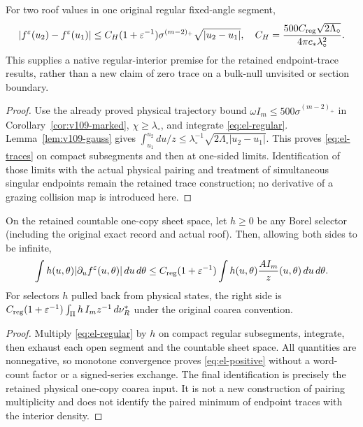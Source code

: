 \begin{corollary}
\label{cor:el-traces}
For two roof values in one original regular fixed-angle segment,
\begin{equation}\label{eq:el-traces}
 |f^\varepsilon(u_2)-f^\varepsilon(u_1)|
 \leq C_H(1+\varepsilon^{-1})\sigma^{(m-2)_+}\sqrt{|u_2-u_1|},
 \quad
 C_H=\frac{500C_{\rm reg}\sqrt{2\Lambda_\circ}}
                  {4\pi c_*\lambda_\circ^2}.
\end{equation}
This supplies a native regular-interior premise for the retained
endpoint-trace results, rather than a new claim of zero trace on a
bulk-null unvisited or section boundary.
\end{corollary}
\begin{proof}
Use the already proved physical trajectory bound
$\omega I_m\leq500\sigma^{(m-2)_+}$ in
Corollary~\ref{cor:v109-marked}, $\chi\geq\lambda_\circ$, and integrate
\eqref{eq:el-regular}. Lemma~\ref{lem:v109-gauss} gives
$\int_{u_1}^{u_2}du/z\leq\lambda_\circ^{-1}
\sqrt{2\Lambda_\circ|u_2-u_1|}$. This proves \eqref{eq:el-traces} on
compact subsegments and then at one-sided limits. Identification of
those limits with the actual physical pairing and treatment of
simultaneous singular endpoints remain the retained trace construction;
no derivative of a grazing collision map is introduced here.
\end{proof}

\begin{proposition}
\label{prop:el-positive}
On the retained countable one-copy sheet space, let $h\geq0$ be any
Borel selector (including the original exact record and actual roof).
Then, allowing both sides to be infinite,
\begin{equation}\label{eq:el-positive}
 \int h(u,\theta)|\partial_u f^\varepsilon(u,\theta)|\,du\,d\theta
 \leq C_{\rm reg}(1+\varepsilon^{-1})
       \int h(u,\theta)\frac{A I_m}{z}(u,\theta)\,du\,d\theta.
\end{equation}
For selectors $h$ pulled back from physical states, the right side is
$C_{\rm reg}(1+\varepsilon^{-1})
\int_\Pi h\,I_m z^{-1}\,d\nu_R^*$ under the original coarea convention.
\end{proposition}
\begin{proof}
Multiply \eqref{eq:el-regular} by $h$ on compact regular subsegments,
integrate, then exhaust each open segment and the countable sheet space.
All quantities are nonnegative, so monotone convergence proves
\eqref{eq:el-positive} without a word-count factor or a signed-series
exchange. The final identification is precisely the retained physical
one-copy coarea input. It is not a new construction of pairing
multiplicity and does not identify the paired minimum of endpoint
traces with the interior density.
\end{proof}

